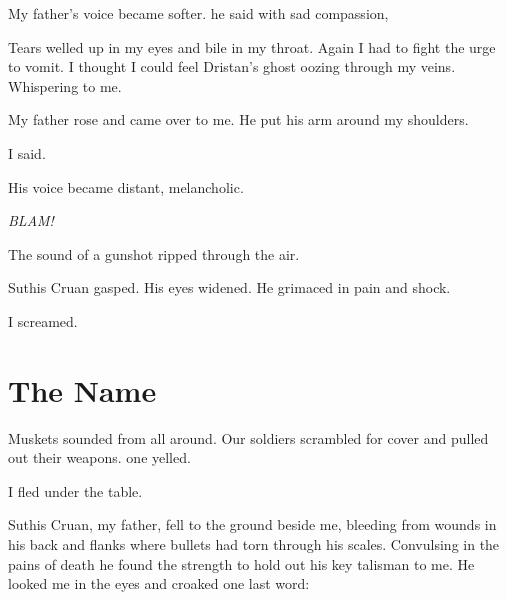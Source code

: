 \documentclass
  [a4paper,
   12pt,
   oneside
  ]%
  {article}
\begin{document}
My father's voice became softer. 
 he said with sad compassion, 

Tears welled up in my eyes and bile in my throat.
Again I had to fight the urge to vomit. 
I thought I could feel Dristan's ghost oozing through my veins.
Whispering to me.

My father rose and came over to me. 
He put his arm around my shoulders.

 I said. 

His voice became distant, melancholic.


\emph{BLAM!}

The sound of a gunshot ripped through the air.

Suthis Cruan gasped. 
His eyes widened.
He grimaced in pain and shock. 

I screamed. 









\section{The Name}
Muskets sounded from all around. 
Our soldiers scrambled for cover and pulled out their weapons. 
 one yelled.

I fled under the table. 

Suthis Cruan, my father, fell to the ground beside me, bleeding from wounds in his back and flanks where bullets had torn through his scales. 
Convulsing in the pains of death he found the strength to hold out his key talisman to me. 
He looked me in the eyes and croaked one last word:
\end{document}
